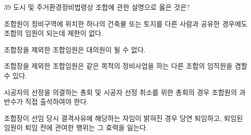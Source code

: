 \begin{question}{39}
도시 및 주거환경정비법령상 조합에 관한 설명으로 옳은 것은?
\begin{choices}
  \item 조합원이 정비구역에 위치한 하나의 건축물 또는 토지를 다른 사람과 공유한 경우에도 조합의 임원이 되는데 제한이 없다.
  \item 조합장을 제외한 조합임원은 대의원이 될 수 없다.
  \item 조합장을 제외한 조합임원은 같은 목적의 정비사업을 하는 다른 조합의 임직원을 겸할 수 있다.
  \item 시공자의 선정을 의결하는 총회 및 시공자 선정 취소를 위한 총회의 경우 조합원의 과반수가 직접 출석하여야 한다.
  \item 조합장이 선임 당시 결격사유에 해당하는 자임이 밝혀진 경우 당연 퇴임하고, 퇴임된 임원이 퇴임 전에 관여한 행위는 그 효력을 잃는다.
\end{choices}
\end{question}
